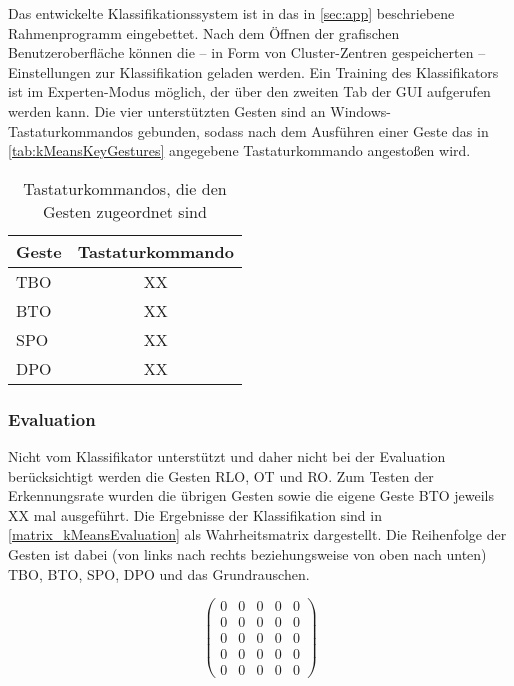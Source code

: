 Das entwickelte Klassifikationssystem ist in das in \autoref{sec:app} beschriebene Rahmenprogramm eingebettet. Nach dem Öffnen der grafischen Benutzeroberfläche können die -- in Form von Cluster-Zentren gespeicherten --  Einstellungen zur Klassifikation geladen werden. Ein Training des Klassifikators ist im Experten-Modus möglich, der über den zweiten Tab der GUI aufgerufen werden kann. Die vier unterstützten Gesten sind an Windows-Tastaturkommandos gebunden, sodass nach dem Ausführen einer Geste das in \autoref{tab:kMeansKeyGestures} angegebene Tastaturkommando angestoßen wird.

\begin{table}[h]
\centering
\begin{tabular}{|p{}|c|}
\hline
 \textbf{Geste} & \textbf{Tastaturkommando} \\
 \hline
  \ac{TBO} & XX \\
 \hline
  BTO & XX \\
 \hline
  \ac{SPO} & XX \\
 \hline
  \ac{DPO} & XX \\
 \hline
\end{tabular}
\caption[Tastaturkommandos, die den Gesten zugeordnet sind]{Tastaturkommandos, die den Gesten zugeordnet sind}
\label{tab:kMeansKeyGestures}
\end{table}



\subsubsection{Evaluation}

Nicht vom Klassifikator unterstützt und daher nicht bei der Evaluation berücksichtigt werden die Gesten \ac{RLO}, \ac{OT} und \ac{RO}. Zum Testen der Erkennungsrate wurden die übrigen Gesten sowie die eigene Geste BTO jeweils XX mal ausgeführt. Die Ergebnisse der Klassifikation sind in  \autoref{matrix_kMeansEvaluation} als Wahrheitsmatrix dargestellt. Die Reihenfolge der Gesten ist dabei (von links nach rechts beziehungsweise von oben nach unten) \ac{TBO}, BTO, \ac{SPO}, \ac{DPO} und das Grundrauschen.

\begin{center}
\begin{equation}
\label{matrix_kMeansEvaluation}
\begin{pmatrix}
0 & 0 & 0 & 0 & 0\\
0 & 0 & 0 & 0 & 0\\
0 & 0 & 0 & 0 & 0\\
0 & 0 & 0 & 0 & 0\\
0 & 0 & 0 & 0 & 0
\end{pmatrix}
\end{equation}
\end{center}


